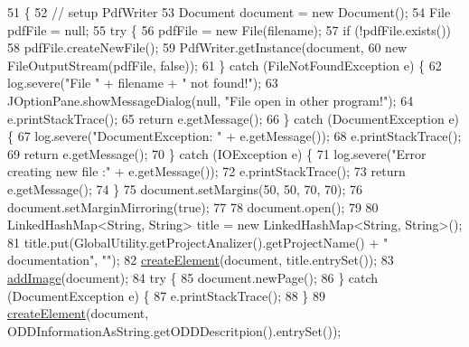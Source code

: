 \begin{DoxyCode}
51                                              \{
52         \textcolor{comment}{// setup PdfWriter}
53         Document document = \textcolor{keyword}{new} Document();
54         File pdfFile = null;
55         \textcolor{keywordflow}{try} \{
56             pdfFile = \textcolor{keyword}{new} File(filename);
57             \textcolor{keywordflow}{if} (!pdfFile.exists())
58                 pdfFile.createNewFile();
59             PdfWriter.getInstance(document,
60                     \textcolor{keyword}{new} FileOutputStream(pdfFile, \textcolor{keyword}{false}));
61         \} \textcolor{keywordflow}{catch} (FileNotFoundException e) \{
62             log.severe(\textcolor{stringliteral}{"File "} + filename + \textcolor{stringliteral}{" not found!"});
63             JOptionPane.showMessageDialog(null, \textcolor{stringliteral}{"File open in other program!"});
64             e.printStackTrace();
65             \textcolor{keywordflow}{return} e.getMessage();
66         \} \textcolor{keywordflow}{catch} (DocumentException e) \{
67             log.severe(\textcolor{stringliteral}{"DocumentException: "} + e.getMessage());
68             e.printStackTrace();
69             \textcolor{keywordflow}{return} e.getMessage();
70         \} \textcolor{keywordflow}{catch} (IOException e) \{
71             log.severe(\textcolor{stringliteral}{"Error creating new file :"} + e.getMessage());
72             e.printStackTrace();
73             \textcolor{keywordflow}{return} e.getMessage();
74         \}
75         document.setMargins(50, 50, 70, 70);
76         document.setMarginMirroring(\textcolor{keyword}{true});
77         
78         document.open();
79         
80         LinkedHashMap<String, String> title = \textcolor{keyword}{new} LinkedHashMap<String, String>();
81         title.put(GlobalUtility.getProjectAnalizer().getProjectName() + \textcolor{stringliteral}{" documentation"}, \textcolor{stringliteral}{""});
82         \hyperlink{classit_1_1isislab_1_1masonhelperdocumentation_1_1mason_1_1control_1_1_p_d_f_generator_ac98a9ab63c62a942fc1d410aab226e36}{createElement}(document, title.entrySet());
83         \hyperlink{classit_1_1isislab_1_1masonhelperdocumentation_1_1mason_1_1control_1_1_p_d_f_generator_abc1f7c0af1e9a3328d917e6e1751d421}{addImage}(document);
84         \textcolor{keywordflow}{try} \{
85             document.newPage();
86         \} \textcolor{keywordflow}{catch} (DocumentException e) \{
87             e.printStackTrace();
88         \}
89         \hyperlink{classit_1_1isislab_1_1masonhelperdocumentation_1_1mason_1_1control_1_1_p_d_f_generator_ac98a9ab63c62a942fc1d410aab226e36}{createElement}(document, ODDInformationAsString.getODDDescritpion().entrySet());

\end{DoxyCode}
